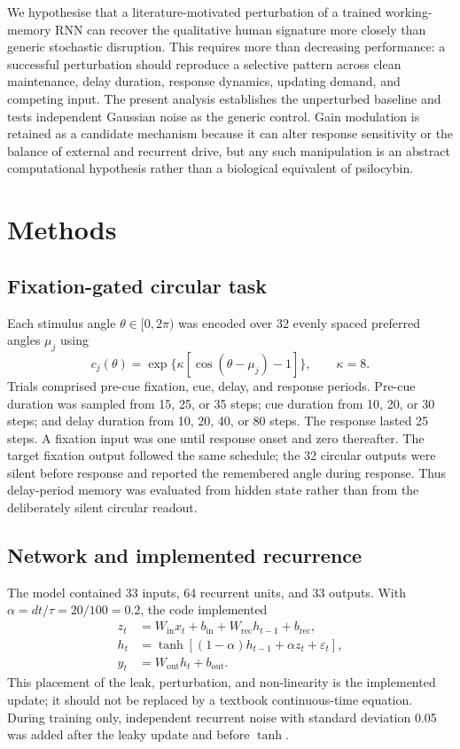 \documentclass[12pt,a4paper]{article}
\begin{document}
We hypothesise that a literature-motivated perturbation of a trained
working-memory RNN can recover the qualitative human signature more closely
than generic stochastic disruption. This requires more than decreasing
performance: a successful perturbation should reproduce a selective pattern
across clean maintenance, delay duration, response dynamics, updating demand,
and competing input. The present analysis establishes the unperturbed baseline
and tests independent Gaussian noise as the generic control. Gain modulation
is retained as a candidate mechanism because it can alter response sensitivity
or the balance of external and recurrent drive, but any such manipulation is
an abstract computational hypothesis rather than a biological equivalent of
psilocybin.

\section{Methods}

\subsection{Fixation-gated circular task}

Each stimulus angle $\theta\in[0,2\pi)$ was encoded over 32 evenly spaced
preferred angles $\mu_j$ using
\begin{equation}
  c_j(\theta)=\exp\{\kappa[\cos(\theta-\mu_j)-1]\},\qquad \kappa=8.
\end{equation}
Trials comprised pre-cue fixation, cue, delay, and response periods. Pre-cue
duration was sampled from 15, 25, or 35 steps; cue duration from 10, 20, or 30
steps; and delay duration from 10, 20, 40, or 80 steps. The response lasted 25
steps. A fixation input was one until response onset and zero thereafter. The
target fixation output followed the same schedule; the 32 circular outputs
were silent before response and reported the remembered angle during response.
Thus delay-period memory was evaluated from hidden state rather than from the
deliberately silent circular readout.

\subsection{Network and implemented recurrence}

The model contained 33 inputs, 64 recurrent units, and 33 outputs. With
$\alpha=dt/\tau=20/100=0.2$, the code implemented
\begin{align}
  z_t &= W_{\mathrm{in}}x_t+b_{\mathrm{in}}
       +W_{\mathrm{rec}}h_{t-1}+b_{\mathrm{rec}},\\
  h_t &= \tanh\!\left[(1-\alpha)h_{t-1}+\alpha z_t+\varepsilon_t\right],\\
  y_t &= W_{\mathrm{out}}h_t+b_{\mathrm{out}} .
\end{align}
This placement of the leak, perturbation, and non-linearity is the implemented
update; it should not be replaced by a textbook continuous-time equation.
During training only, independent recurrent noise with standard deviation
0.05 was added after the leaky update and before $\tanh$.
\end{document}
